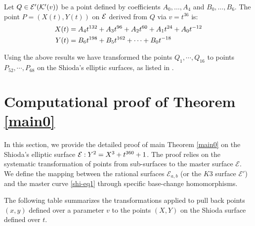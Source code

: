 \documentclass[11pt]{amsart}
\begin{document}
 \begin{cor}
 	\label{case_1_10}
 	Let $Q \in {\mathcal E}' ({\mathcal K}'(v))$ be a point defined by coefficients $A_0, \dots, A_4$ and $B_0, \dots, B_6$.
 The point $P=(X(t), Y(t))$ on ${\mathcal E}$ derived from $Q$ via $v=t^{36}$ is:
 		\begin{align}
 			 X(t) & =   A_4 t^{132} + A_3 t^{96} + A_2 t^{60} + A_1 t^{24} + A_0 t^{-12} \notag \\ 			 
 			 Y(t) &=   B_6 t^{198} + B_5 t^{162} + \dots + B_0 t^{-18} 
 			 \end{align}
 \end{cor}
 
 Using the above results we have transformed the points $Q_1,\cdots, Q_16$ to points $P_{52}, \cdots, P_{68}$ on the Shioda's elliptic surfaces, as listed in \cite[Points68]{Shioda360-Codes}.
 
\section{Computational proof of Theorem \ref{main0}}
\label{proof}
In this section, we provide the detailed proof of main Theorem \ref{main0} on the Shioda's elliptic surface ${\mathcal E}: Y^2 = X^3 + t^{360} + 1$.
	The proof  relies on the systematic transformation of points from sub-surfaces to the master surface $\mathcal{E}$. We define the mapping between the rational surfaces $\mathcal{E}_{a,b}$ (or the $K3$ surface $\mathcal{E}'$) and the master curve \eqref{shi-eq1} through specific base-change homomorphisms.


The following table summarizes the transformations applied to pull back points $(x, y)$ defined over a parameter $v$ to the points $(X,Y)$ on the Shioda surface defined over $t$.
\end{document}
